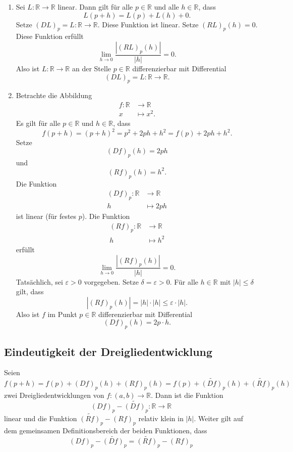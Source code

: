 \documentclass[../main.tex]{subfiles}
\begin{document}
\begin{examples}
  \leavevmode
  \begin{enumerate}[(1)]
    \item Sei $L \colon \mathbb{R} \to \mathbb{R}$ 
      linear.
      Dann gilt für alle $p \in \mathbb{R}$ und alle
      $h \in \mathbb{R}$, dass
      \[
        L(p + h) = L(p) + L(h) + 0.
      \]
      Setze ${(DL)}_p = L \colon \mathbb{R} \to \mathbb{R}$.
      Diese Funktion ist linear. Setze
      ${(RL)}_p(h) = 0$. Diese Funktion erfüllt
      \[
        \lim_{h \to 0} \frac{|{(RL)}_p(h)|}{|h|} = 0.
      \]
      Also ist $L \colon \mathbb{R} \to \mathbb{R}$
      an der Stelle $p \in \mathbb{R}$ 
      differenzierbar mit Differential
      \[
      {(DL)}_p = L \colon \mathbb{R} \to \mathbb{R}.
      \]
    \item Betrachte die Abbildung
      \begin{align*}
        f \colon \mathbb{R} & \to \mathbb{R} \\
        x & \mapsto x^2.
      \end{align*}
      Es gilt für alle $p \in \mathbb{R}$ und
      $h \in \mathbb{R}$, dass
      \[
        f( p + h ) = {(p + h)}^2
        = p^2 + 2ph + h^2
        = f(p) + 2ph + h^2.
      \]
      Setze
      \[
        {(Df)}_p(h) = 2ph
      \]
      und
      \[
        {(Rf)}_p(h) = h^2.
      \]
      Die Funktion
      \begin{align*}
        {(Df)}_p \colon \mathbb{R} & \to \mathbb{R} \\
        h & \mapsto 2ph
      \end{align*}
      ist linear (für festes $p$).
      Die Funktion
      \begin{align*}
        {(Rf)}_p \colon \mathbb{R} & \to \mathbb{R} \\
        h & \mapsto h^2
      \end{align*}
      erfüllt
      \[
        \lim_{h \to 0} \frac{|{(Rf)}_p(h)|}{|h|} = 0.
      \]
      Tatsächlich, sei $\varepsilon > 0$ vorgegeben.
      Setze $\delta = \varepsilon > 0$.
      Für alle $h \in \mathbb{R}$ mit $|h| \leq \delta$ gilt,
      dass
      \[
        |{(Rf)}_p(h)| = |h| \cdot |h| \leq \varepsilon \cdot |h|.
      \]
      Also ist $f$ im Punkt $p \in \mathbb{R}$ differenzierbar
      mit Differential
      \[
        {(Df)}_p(h) = 2p \cdot h.
      \]
  \end{enumerate}
\end{examples}

\subsection*{Eindeutigkeit der Dreigliedentwicklung}
Seien
\[
  f(p + h) = f(p) + {(Df)}_p(h) + {(Rf)}_p(h)
  = f(p) + \widetilde{{(Df)}}_p(h) + \widetilde{{(Rf)}}_p(h)
\]
zwei Dreigliedentwicklungen von $f \colon (a, b) \to \mathbb{R}$.
Dann ist die Funktion
\[
{(Df)}_p - \widetilde{{(Df)}}_p \colon \mathbb{R} \to \mathbb{R}
\]
linear und die Funktion
$
  \widetilde{{(Rf)}}_p- {(Rf)}_p 
$
relativ klein in $|h|$.
Weiter gilt auf dem gemeinsamen Definitionsbereich der
beiden Funktionen, dass
\[
{(Df)}_p - \widetilde{{(Df)}}_p 
  =  \widetilde{{(Rf)}}_p-{(Rf)}_p 
\]
\end{document}
